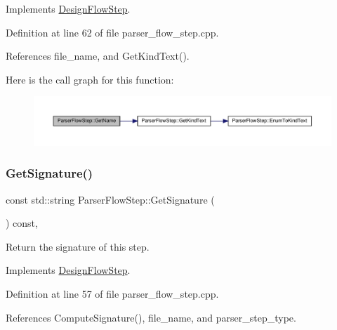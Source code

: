 Implements \hyperlink{classDesignFlowStep_a01e5ebfab88db3b3b7f832f80075fad8}{Design\+Flow\+Step}.



Definition at line 62 of file parser\+\_\+flow\+\_\+step.\+cpp.



References file\+\_\+name, and Get\+Kind\+Text().

Here is the call graph for this function\+:
\nopagebreak
\begin{figure}[H]
\begin{center}
\leavevmode
\includegraphics[width=350pt]{dd/d99/classParserFlowStep_adc59d75712212fd7d908550665d5719b_cgraph}
\end{center}
\end{figure}
\mbox{\label{classParserFlowStep_aa20842b21ed80673edb2fc8a664cc9b6}} 
\subsubsection{\texorpdfstring{Get\+Signature()}{GetSignature()}}
{\footnotesize\ttfamily const std\+::string Parser\+Flow\+Step\+::\+Get\+Signature (\begin{DoxyParamCaption}{ }\end{DoxyParamCaption}) const\hspace{0.3cm}{\ttfamily [override]}, {\ttfamily [virtual]}}



Return the signature of this step. 



Implements \hyperlink{classDesignFlowStep_ab111e3d4058615c2dedc0505978d4699}{Design\+Flow\+Step}.



Definition at line 57 of file parser\+\_\+flow\+\_\+step.\+cpp.



References Compute\+Signature(), file\+\_\+name, and parser\+\_\+step\+\_\+type.

